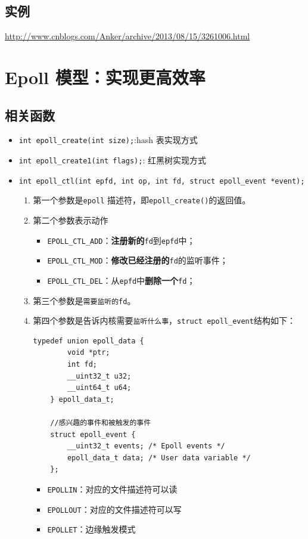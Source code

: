 \documentclass[UTF8,a4paper,12pt]{ctexbook}
\begin{document}
		\subsection{实例}
		
		\url{http://www.cnblogs.com/Anker/archive/2013/08/15/3261006.html}
	\section{Epoll 模型：实现更高效率}
		\subsection{相关函数}
			\begin{itemize}
				\item \verb|int epoll_create(int size);|:hash 表实现方式
				\item \verb|int epoll_create1(int flags);|: 红黑树实现方式
				\item \verb|int epoll_ctl(int epfd, int op, int fd, struct epoll_event *event);|
					\begin{enumerate}[itemindent = 1em]
						\item 第一个参数是\verb|epoll| 描述符，即\verb|epoll_create()|的返回值。
						\item 第二个参数表示动作
							\begin{itemize}
								\item \verb|EPOLL_CTL_ADD|：\textbf{注册新的}\verb|fd|到\verb|epfd|中；
								\item \verb|EPOLL_CTL_MOD|：\textbf{修改已经注册的}\verb|fd|的监听事件；
								\item \verb|EPOLL_CTL_DEL|：从\verb|epfd|中\textbf{删除一个}\verb|fd|；
							\end{itemize}
						\item 第三个参数是\verb|需要监听的fd|。
						\item 第四个参数是告诉内核需要\verb|监听什么事|，\verb|struct epoll_event|结构如下：
							\begin{lstlisting}[frame=L]
	typedef union epoll_data {  
		void *ptr;  
		int fd;  
		__uint32_t u32;  
		__uint64_t u64;  
	} epoll_data_t;  
	
	//感兴趣的事件和被触发的事件  
	struct epoll_event {  
		__uint32_t events; /* Epoll events */  
		epoll_data_t data; /* User data variable */  
	};  
							\end{lstlisting}
							
							\begin{itemize}
								\item \verb|EPOLLIN|：对应的文件描述符可以读
								\item \verb|EPOLLOUT|：对应的文件描述符可以写
								\item \verb|EPOLLET|：边缘触发模式
							\end{itemize}
							

\end{enumerate}
\end{itemize}
\end{document}
